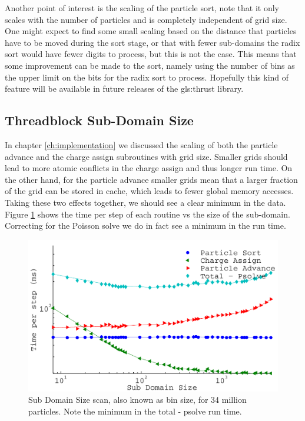 Another point of interest is the scaling of the particle sort, note that it only scales with the number of particles and is completely independent of grid size. One might expect to find some small scaling based on the distance that particles have to be moved during the sort stage, or that with fewer sub-domains the radix sort would have fewer digits to process, but this is not the case. This means that some improvement can be made to the sort, namely using the number of bins as the upper limit on the bits for the radix sort to process. Hopefully this kind of feature will be available in future releases of the \gls{gls:thrust} library.



\subsection{Threadblock Sub-Domain Size}
In chapter \ref{ch:implementation} we discussed the scaling of both the particle advance and the charge assign subroutines with grid size. Smaller grids should lead to more atomic conflicts in the charge assign and thus longer run time. On the other hand, for the particle advance smaller grids mean that a larger fraction of the grid can be stored in cache, which leads to fewer global memory accesses. Taking these two effects together, we should see a clear minimum in the data. Figure \ref{fig:subdomain_size_scan} shows the time per step of each routine vs the size of the sub-domain. Correcting for the Poisson solve we do in fact see a minimum in the run time. 

\begin{figure}[H]
\begin{center}
\includegraphics[width=6in]{performance/gridshape_scan.pdf}
\end{center}
\caption[Sub Domain Size scan]{Sub Domain Size scan, also known as bin size, for 34 million particles. Note the minimum in the total - psolve run time.}
\label{fig:subdomain_size_scan}
\end{figure}


